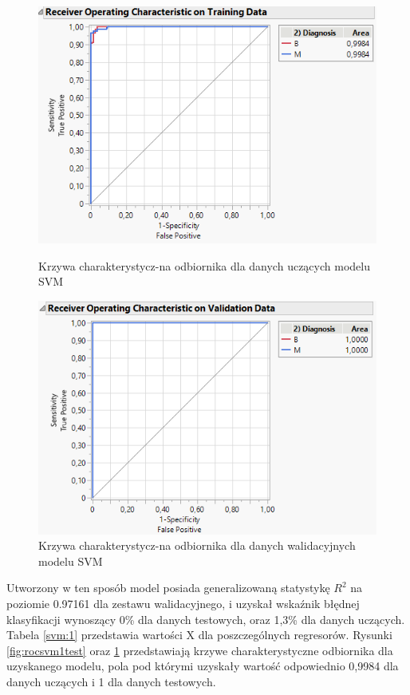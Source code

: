 \begin{figure}[!ht]
	\begin{minipage}{0.48\textwidth}
		\centering
		\includegraphics[width=0.98\linewidth]{Rysunki/Rozdzial3/roc_svm1_test}
		\caption{Krzywa charakterystycz-na odbiornika dla danych uczących modelu SVM}
		\label{fig:rocsvm1test}		
	\end{minipage}%
	\hspace{10pt}
	\begin{minipage}{0.48\textwidth}
		\centering
		\includegraphics[width=0.98\linewidth]{Rysunki/Rozdzial3/roc_svm1_val}
		\caption{Krzywa charakterystycz-na odbiornika dla danych walidacyjnych modelu SVM}
		\label{fig:rocsvm1val}				
	\end{minipage}	
\end{figure}

Utworzony w ten sposób model posiada generalizowaną statystykę $R^{2}$ na poziomie 0.97161 dla zestawu walidacyjnego, i uzyskał wskaźnik błędnej klasyfikacji wynoszący 0\% dla danych testowych, oraz 1,3\% dla danych uczących. Tabela \ref{svm:1} przedstawia wartości X dla poszczególnych regresorów. Rysunki \ref{fig:rocsvm1test} oraz \ref{fig:rocsvm1val} przedstawiają krzywe charakterystyczne odbiornika dla uzyskanego modelu, pola pod którymi uzyskały wartość odpowiednio 0,9984 dla danych uczących i 1 dla danych testowych.

